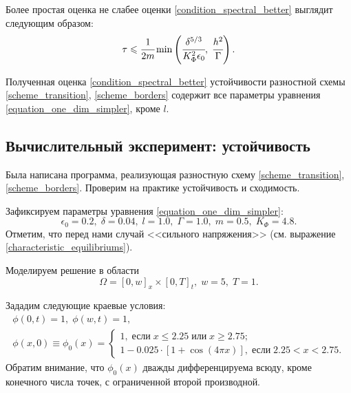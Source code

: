 \documentclass[a4paper,12pt]{article}
\theoremstyle{plain}
\theoremstyle{definition}
\begin{document}
Более простая оценка не слабее оценки \eqref{condition_spectral_better} выглядит следующим образом:
\begin{equation}
    \tau \leqslant \cfrac{1}{2m} \min \left(\cfrac{\delta^{5/3}}{K_\Phi^2 \epsilon_0}, \; \cfrac{h^2}{\Gamma} \right) \text{.}
    \label{condition_spectral_better_simpler}
\end{equation}

Полученная оценка \eqref{condition_spectral_better} устойчивости разностной схемы \eqref{scheme_transition}, \eqref{scheme_borders} содержит все параметры уравнения \eqref{equation_one_dim_simpler}, кроме $l$.


\subsection{Вычислительный эксперимент: устойчивость}

Была написана программа, реализующая разностную схему \eqref{scheme_transition}, \eqref{scheme_borders}. Проверим на практике устойчивость и сходимость.

Зафиксируем параметры уравнения \eqref{equation_one_dim_simpler}:
\begin{equation}
    \epsilon_0 = 0.2, \; \delta = 0.04, \; l = 1.0, \; \Gamma = 1.0, \; m = 0.5, \; K_\Phi = 4.8 \text{.}
    \label{experiment_parameters}
\end{equation}
Отметим, что перед нами случай <<сильного напряжения>> (см. выражение \eqref{characteristic_equilibriums}).

Моделируем решение в области 
\begin{equation}
    \Omega = [0, w]_x \times [0, T]_t, \; w = 5, \; T = 1 \text{.}
    \label{experiment_set}
\end{equation}

Зададим следующие краевые условия:
\begin{equation}
\begin{gathered}
    \phi(0, t) = 1, \; \phi(w, t) = 1 \text{,} \\
    \phi(x, 0) \equiv \phi_0(x) = \begin{cases}
        1, \; \text{если} \; x \leqslant 2.25 \; \text{или} \; x \geqslant 2.75 \text{;} \\
        1 - 0.025 \cdot [1 + \cos(4 \pi x)], \; \text{если} \; 2.25 < x < 2.75 \text{.}
    \end{cases}
\end{gathered} \label{experiment_borders}
\end{equation}
Обратим внимание, что $\phi_0(x)$ дважды дифференцируема всюду, кроме конечного числа точек, с ограниченной второй производной.
\end{document}
